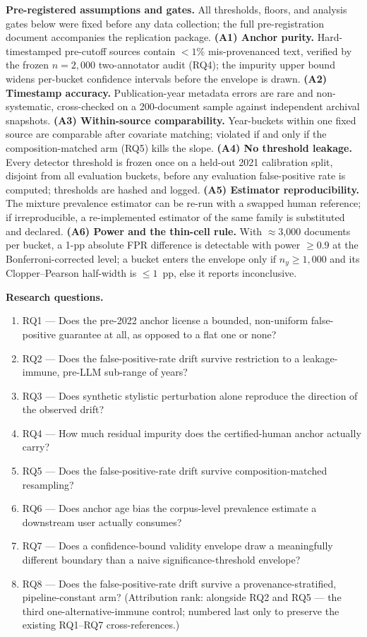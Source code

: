 \documentclass[conference]{IEEEtran}
\begin{document}
\smallskip\noindent\textbf{Pre-registered assumptions and gates.} All thresholds, floors, and analysis gates below were fixed before any data collection; the full pre-registration document accompanies the replication package. \textbf{(A1) Anchor purity.} Hard-timestamped pre-cutoff sources contain $<1\%$ mis-provenanced text, verified by the frozen $n=2{,}000$ two-annotator audit (RQ4); the impurity upper bound widens per-bucket confidence intervals before the envelope is drawn. \textbf{(A2) Timestamp accuracy.} Publication-year metadata errors are rare and non-systematic, cross-checked on a 200-document sample against independent archival snapshots. \textbf{(A3) Within-source comparability.} Year-buckets within one fixed source are comparable after covariate matching; violated if and only if the composition-matched arm (RQ5) kills the slope. \textbf{(A4) No threshold leakage.} Every detector threshold is frozen once on a held-out 2021 calibration split, disjoint from all evaluation buckets, before any evaluation false-positive rate is computed; thresholds are hashed and logged. \textbf{(A5) Estimator reproducibility.} The mixture prevalence estimator can be re-run with a swapped human reference; if irreproducible, a re-implemented estimator of the same family is substituted and declared. \textbf{(A6) Power and the thin-cell rule.} With $\approx$3{,}000 documents per bucket, a 1-pp absolute FPR difference is detectable with power $\geq 0.9$ at the Bonferroni-corrected level; a bucket enters the envelope only if $n_y \geq 1{,}000$ and its Clopper--Pearson half-width is $\leq 1$~pp, else it reports inconclusive.

\smallskip\noindent\textbf{Research questions.}
\begin{enumerate}[leftmargin=1.6em]
\item RQ1 --- Does the pre-2022 anchor license a bounded, non-uniform false-positive guarantee at all, as opposed to a flat one or none?
\item RQ2 --- Does the false-positive-rate drift survive restriction to a leakage-immune, pre-LLM sub-range of years?
\item RQ3 --- Does synthetic stylistic perturbation alone reproduce the direction of the observed drift?
\item RQ4 --- How much residual impurity does the certified-human anchor actually carry?
\item RQ5 --- Does the false-positive-rate drift survive composition-matched resampling?
\item RQ6 --- Does anchor age bias the corpus-level prevalence estimate a downstream user actually consumes?
\item RQ7 --- Does a confidence-bound validity envelope draw a meaningfully different boundary than a naive significance-threshold envelope?
\item RQ8 --- Does the false-positive-rate drift survive a provenance-stratified, pipeline-constant arm? (Attribution rank: alongside RQ2 and RQ5 --- the third one-alternative-immune control; numbered last only to preserve the existing RQ1--RQ7 cross-references.)
\end{enumerate}
\end{document}
